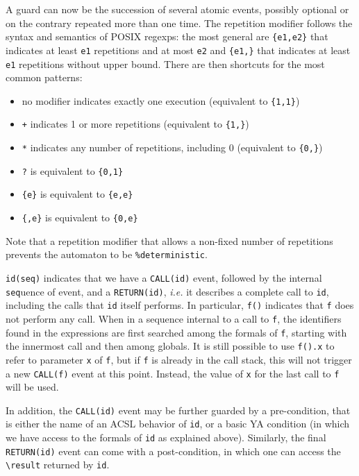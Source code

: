 \documentclass{frama-c-book}
\begin{document}
A guard can now be the succession of several atomic events, possibly optional
or on the contrary repeated more than one time. The repetition modifier
follows the syntax and semantics of POSIX regexps: the most general are
\lstinline|{e1,e2}| that indicates at least \lstinline|e1| repetitions and at
most \lstinline|e2| and \lstinline|{e1,}| that indicates at least
\texttt{e1} repetitions without upper bound. There are then shortcuts for the
most common patterns:
\begin{itemize}
\item no modifier indicates exactly one execution (equivalent to
\lstinline|{1,1}|)
\item \lstinline|+| indicates 1 or more repetitions
(equivalent to \lstinline|{1,}|)
\item \lstinline|*| indicates any number of repetitions, including 0
  (equivalent to \lstinline|{0,}|)
\item \lstinline|?| is equivalent to \lstinline|{0,1}|
\item \lstinline|{e}| is equivalent to \lstinline|{e,e}|
\item \lstinline|{,e}| is equivalent to \lstinline|{0,e}|
\end{itemize}

Note that a repetition modifier that allows a non-fixed number of
repetitions prevents the automaton to be \lstinline|%deterministic|.

\lstinline|id(seq)| indicates that we have a \lstinline|CALL(id)| event,
followed by the internal \texttt{seq}uence of event, and a
\lstinline|RETURN(id)|,
\textit{i.e.} it describes a complete call to \texttt{id}, including the calls
that \lstinline|id| itself performs. In particular, \lstinline|f()| indicates
that \lstinline|f| does not perform any call.
When in a sequence internal to a call to \lstinline|f|, the identifiers found in
the expressions are first searched among the formals of \lstinline|f|,
starting with the innermost call and then among globals. It is still possible
to use \lstinline|f().x| to refer to parameter \lstinline|x| of \lstinline|f|,
but if \lstinline|f| is already in the call stack, this will not trigger a new
\lstinline|CALL(f)| event at this point.
Instead, the value of \lstinline|x| for the
last call to \lstinline|f| will be used.

In addition, the \lstinline|CALL(id)| event may be further guarded by a
pre-condition, that is either the name of an ACSL behavior of \lstinline|id|,
or a basic YA condition (in which we have access to the formals of
 \lstinline|id| as explained above). Similarly, the final
\lstinline|RETURN(id)| event can come with a
post-condition, in which one can access the \lstinline|\result|
returned by \lstinline|id|.
\end{document}
